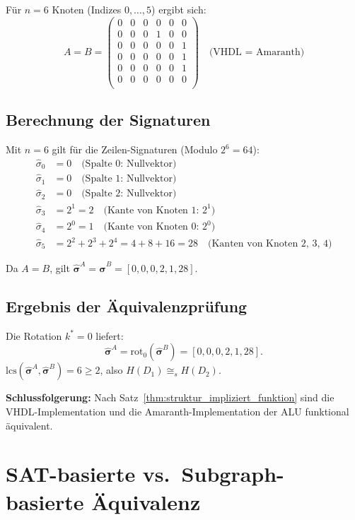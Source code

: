 ﻿\documentclass[12pt,a4paper]{report}
\begin{document}
Für $n = 6$ Knoten (Indizes $0,\ldots,5$) ergibt sich:
\[
A = B = \begin{pmatrix}
0 & 0 & 0 & 0 & 0 & 0 \\
0 & 0 & 0 & 1 & 0 & 0 \\
0 & 0 & 0 & 0 & 0 & 1 \\
0 & 0 & 0 & 0 & 0 & 1 \\
0 & 0 & 0 & 0 & 0 & 1 \\
0 & 0 & 0 & 0 & 0 & 0 \\
\end{pmatrix}
\quad \text{(VHDL = Amaranth)}
\]

\subsection{Berechnung der Signaturen}

Mit $n = 6$ gilt für die Zeilen-Signaturen (Modulo $2^6 = 64$):
\begin{align*}
\hat{\sigma}_0 &= 0 \quad \text{(Spalte 0: Nullvektor)}\\
\hat{\sigma}_1 &= 0 \quad \text{(Spalte 1: Nullvektor)}\\
\hat{\sigma}_2 &= 0 \quad \text{(Spalte 2: Nullvektor)}\\
\hat{\sigma}_3 &= 2^1 = 2 \quad \text{(Kante von Knoten 1: } 2^1\text{)}\\
\hat{\sigma}_4 &= 2^0 = 1 \quad \text{(Kante von Knoten 0: } 2^0\text{)}\\
\hat{\sigma}_5 &= 2^2 + 2^3 + 2^4 = 4 + 8 + 16 = 28 \quad \text{(Kanten von Knoten 2, 3, 4)}
\end{align*}

Da $A = B$, gilt $\hat{\boldsymbol{\sigma}}^A = \hat{\boldsymbol{\sigma}}^B = [0, 0, 0, 2, 1, 28]$.

\subsection{Ergebnis der Äquivalenzprüfung}

Die Rotation $k^* = 0$ liefert:
\[
\hat{\boldsymbol{\sigma}}^A = \mathrm{rot}_0(\hat{\boldsymbol{\sigma}}^B) = [0, 0, 0, 2, 1, 28].
\]
$\mathrm{lcs}(\hat{\boldsymbol{\sigma}}^A, \hat{\boldsymbol{\sigma}}^B) = 6 \geq 2$, also $H(D_1) \cong_s H(D_2)$.

\textbf{Schlussfolgerung:} Nach Satz~\ref{thm:struktur_impliziert_funktion} sind die VHDL-Implementation und die Amaranth-Implementation der ALU funktional äquivalent.

\section{SAT-basierte vs.\ Subgraph-basierte Äquivalenz}
\label{subsec:vergleich}
\end{document}
